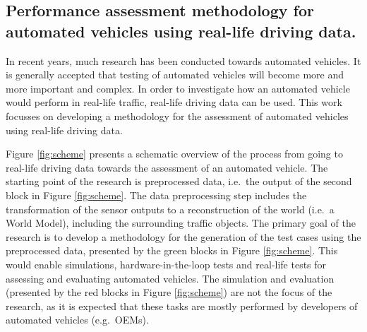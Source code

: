 \documentclass[10pt,final,a4paper,oneside,onecolumn]{article}
\begin{document}
\subsection*{Performance assessment methodology for automated vehicles using real-life driving data.}

In recent years, much research has been conducted towards automated vehicles. It is generally accepted that testing of automated vehicles will become more and more important and complex. In order to investigate how an automated vehicle would perform in real-life traffic, real-life driving data can be used. This work focusses on developing a methodology for the assessment of automated vehicles using real-life driving data.

Figure \ref{fig:scheme} presents a schematic overview of the process from going to real-life driving data towards the assessment of an automated vehicle. The starting point of the research is preprocessed data, i.e.\ the output of the second block in Figure \ref{fig:scheme}. The data preprocessing step includes the transformation of the sensor outputs to a reconstruction of the world (i.e.\ a World Model), including the surrounding traffic objects. The primary goal of the research is to develop a methodology for the generation of the test cases using the preprocessed data, presented by the green blocks in Figure \ref{fig:scheme}. This would enable simulations, hardware-in-the-loop tests and real-life tests for assessing and evaluating automated vehicles. The simulation and evaluation (presented by the red blocks in Figure \ref{fig:scheme}) are not the focus of the research, as it is expected that these tasks are mostly performed by developers of automated vehicles (e.g.\ OEMs).
\end{document}
